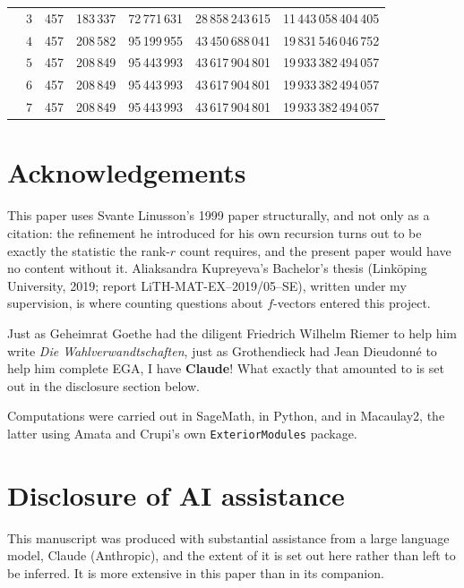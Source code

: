 \documentclass[11pt, a4paper, abstract=yes]{scrartcl}
\theoremstyle{definition}
\theoremstyle{remark}
\theoremstyle{plain}
\begin{document}
\begin{center}
\begin{tabular}{@{}ccrrrrr@{}}
 & \(3\) & 457 & 183\,337 & 72\,771\,631 & 28\,858\,243\,615 & 11\,443\,058\,404\,405\\
 & \(4\) & 457 & 208\,582 & 95\,199\,955 & 43\,450\,688\,041 & 19\,831\,546\,046\,752\\
 & \(5\) & 457 & 208\,849 & 95\,443\,993 & 43\,617\,904\,801 & 19\,933\,382\,494\,057\\
 & \(6\) & 457 & 208\,849 & 95\,443\,993 & 43\,617\,904\,801 & 19\,933\,382\,494\,057\\
 & \(7\) & 457 & 208\,849 & 95\,443\,993 & 43\,617\,904\,801 & 19\,933\,382\,494\,057\\
\bottomrule
\end{tabular}
\end{center}
\endgroup
{}
\label{tab-app-pro}
\section*{Acknowledgements}
\label{sec:org3177331}
This paper uses Svante Linusson's 1999 paper structurally, and not only as a citation: the
refinement he introduced for his own recursion turns out to be exactly the statistic the rank-\(r\)
count requires, and the present paper would have no content without it. Aliaksandra Kupreyeva's Bachelor's thesis \autocite{Kupreyeva2019}
(Linköping University, 2019; report LiTH-MAT-EX--2019/05--SE), written under my supervision, is where
counting questions about \(f\)-vectors entered this project.

Just as Geheimrat Goethe had the diligent Friedrich Wilhelm Riemer to help him write \emph{Die
Wahlverwandtschaften}, just as Grothendieck had Jean Dieudonné to help him complete EGA, I have
\textbf{Claude}! What exactly that amounted to is set out in the disclosure section below.

Computations were carried out in SageMath, in Python, and in Macaulay2, the latter using Amata and
Crupi's own \texttt{ExteriorModules} package.
\section*{Disclosure of AI assistance}
\label{sec:orgf02c39c}
This manuscript was produced with substantial assistance from a large language model, Claude
(Anthropic), and the extent of it is set out here rather than left to be inferred. It is more
extensive in this paper than in its companion.
\end{document}
